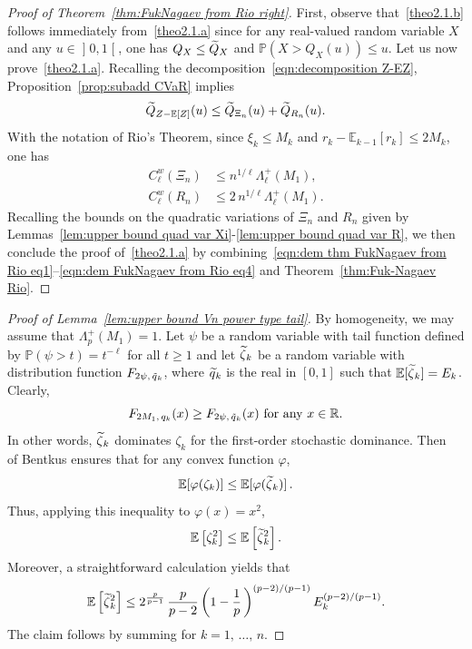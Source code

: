 \documentclass[AHL,Unicode,longabstracts,published]{cedram}
\newcommand{\bE}{\mathbb{E}}
\newcommand{\bP}{\mathbb{P}}
\newcommand{\bR}{\mathbb{R}}
\newcommand{\intervalleoo}[2]{\mathopen{]} #1\mathclose{}\mathpunct{},#2\mathclose{[}}
\let\oldtilde\tilde
\renewcommand*{\tilde}[1]{\mathchoice{\widetilde{#1}}{\widetilde{#1}}{\oldtilde{#1}}{\oldtilde{#1}}}
\begin{document}
\begin{proof}[Proof of Theorem~\ref{thm:FukNagaev from Rio right}]
First, observe that~\eqref{theo2.1.b} follows immediately from~\eqref{theo2.1.a} since for any real-valued random variable $X$ and any $u\in\intervalleoo 01$, one has $Q_X\leq \tilde Q_X$ and $\bP(X>Q_X(u))\leq u$. Let us now prove~\eqref{theo2.1.a}. Recalling the decomposition~\eqref{eqn:decomposition Z-EZ}, Proposition~\ref{prop:subadd CVaR} implies
\begin{equation}\label{eqn:dem thm FukNagaev from Rio eq1}
\tilde{Q}_{Z-\bE[Z]}(u)\leq \tilde{Q}_{\Xi_n}(u) + \tilde{Q}_{R_n}(u).
\end{equation}
With the notation of Rio's Theorem, since $\xi_k\leq M_k$ and $r_k-\bE_{k-1}[r_k]\leq 2M_k$, one has
\begin{align}
C_\ell^w(\Xi_n)&\leq n^{1/\ell}\Lambda_\ell^+(M_1),\label{eqn:dem FukNagaev from Rio eq3}
\\
C_\ell^w(R_n)&\leq 2\,n^{1/\ell}\Lambda_\ell^+(M_1).\label{eqn:dem FukNagaev from Rio eq4}
\end{align}
Recalling the bounds on the quadratic variations of $\Xi_n$ and $R_n$ given by Lemmas~\ref{lem:upper bound quad var Xi}-\ref{lem:upper bound quad var R}, we then conclude the proof of~\eqref{theo2.1.a} by combining~\eqref{eqn:dem thm FukNagaev from Rio eq1}--\eqref{eqn:dem FukNagaev from Rio eq4} and Theorem~\ref{thm:Fuk-Nagaev Rio}.
\end{proof}

\begin{proof}[Proof of Lemma~\ref{lem:upper bound Vn power type tail}]
By homogeneity, we may assume that $\Lambda_p^+(M_1)=1$. Let $\psi$ be a random variable with tail function defined by $\bP(\psi>t)=t^{-\ell}$ for all $t\geq 1$ and let $\tilde{\zeta}_k$ be a random variable with distribution function $F_{2\psi,\,\tilde{q}_k}$, where $\tilde q_k$ is the real in $[0,1]$ such that $\bE[\tilde{\zeta}_k]=E_k$. Clearly,
\[
F_{2M_1,\,q_k}(x)\geq F_{2\psi,\,\tilde{q}_k}(x)\text{ for any } x\in\bR.
\]
In other words, $\tilde \zeta_k$ dominates $\zeta_k$ for the first-order stochastic dominance. Then~\cite[Lemma~1]{Bentkus08a} of Bentkus ensures that for any convex function $\varphi$,
\begin{equation}
\bE[\varphi(\zeta_k)]\leq \bE[\varphi(\tilde\zeta_k)]\,.
\end{equation}
Thus, applying this inequality to $\varphi(x)= x^2$,
\begin{equation}\label{eqn:comparison xi tildexi}
\bE\left[\zeta_k^2\right]\leq \bE\left[\tilde\zeta_k^2\right].
\end{equation}
Moreover, a straightforward calculation yields that
\begin{equation}\label{eqn:bound tilde xi}
\bE\left[\tilde\zeta_k^2\right]\leq 2^{\frac{p}{p-1}}\,\frac{p}{p-2}\left(1-\frac{1}{p}\,\right)^{(p-2)/(p-1)}E_k^{(p-2)/(p-1)}.
\end{equation}
The claim follows by summing for $k=1,\,\ldots,\,n$.
\end{proof}
\end{document}
